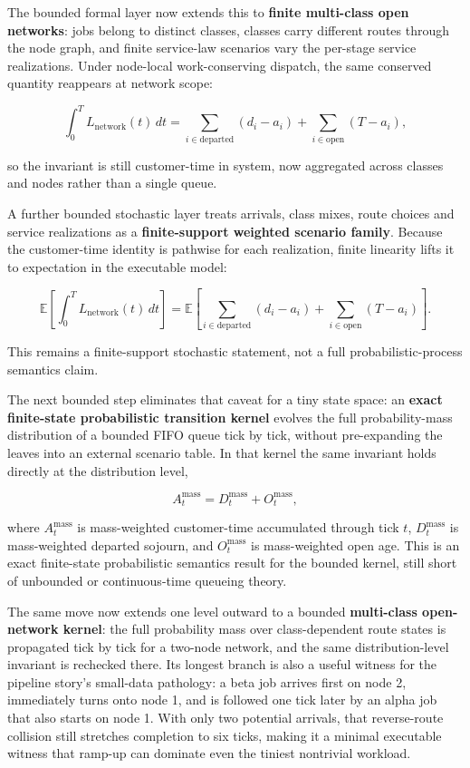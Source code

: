 \documentclass[
  11pt,
]{article}
\begin{document}
The bounded formal layer now extends this to \textbf{finite multi-class
open networks}: jobs belong to distinct classes, classes carry different
routes through the node graph, and finite service-law scenarios vary the
per-stage service realizations. Under node-local work-conserving
dispatch, the same conserved quantity reappears at network scope:

\[
\int_0^T L_{\mathrm{network}}(t)\,dt
=
\sum_{i \in \mathrm{departed}} (d_i - a_i)
+ \sum_{i \in \mathrm{open}} (T - a_i),
\]

so the invariant is still customer-time in system, now aggregated across
classes and nodes rather than a single queue.

A further bounded stochastic layer treats arrivals, class mixes, route
choices and service realizations as a \textbf{finite-support weighted
scenario family}. Because the customer-time identity is pathwise for
each realization, finite linearity lifts it to expectation in the
executable model:

\[
\mathbb{E}\!\left[\int_0^T L_{\mathrm{network}}(t)\,dt\right] =
\mathbb{E}\!\left[\sum_{i \in \mathrm{departed}} (d_i - a_i) + \sum_{i \in \mathrm{open}} (T - a_i)\right].
\]

This remains a finite-support stochastic statement, not a full
probabilistic-process semantics claim.

The next bounded step eliminates that caveat for a tiny state space: an
\textbf{exact finite-state probabilistic transition kernel} evolves the
full probability-mass distribution of a bounded FIFO queue tick by tick,
without pre-expanding the leaves into an external scenario table. In
that kernel the same invariant holds directly at the distribution level,

\[
A_t^{\mathrm{mass}} = D_t^{\mathrm{mass}} + O_t^{\mathrm{mass}},
\]

where \(A_t^{\mathrm{mass}}\) is mass-weighted customer-time accumulated
through tick \(t\), \(D_t^{\mathrm{mass}}\) is mass-weighted departed
sojourn, and \(O_t^{\mathrm{mass}}\) is mass-weighted open age. This is
an exact finite-state probabilistic semantics result for the bounded
kernel, still short of unbounded or continuous-time queueing theory.

The same move now extends one level outward to a bounded
\textbf{multi-class open-network kernel}: the full probability mass over
class-dependent route states is propagated tick by tick for a two-node
network, and the same distribution-level invariant is rechecked there.
Its longest branch is also a useful witness for the pipeline story's
small-data pathology: a beta job arrives first on node 2, immediately
turns onto node 1, and is followed one tick later by an alpha job that
also starts on node 1. With only two potential arrivals, that
reverse-route collision still stretches completion to six ticks, making
it a minimal executable witness that ramp-up can dominate even the
tiniest nontrivial workload.
\end{document}
